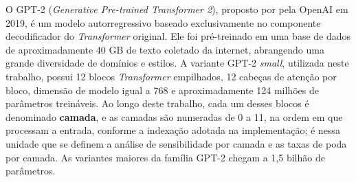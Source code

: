 O GPT-2 (\textit{Generative Pre-trained Transformer 2}), proposto por
 pela OpenAI em 2019, é um modelo autorregressivo baseado
exclusivamente no componente decodificador do \textit{Transformer} original. Ele foi
pré-treinado em uma base de dados de aproximadamente 40 GB de texto coletado da internet,
abrangendo uma grande diversidade de domínios e estilos. A variante GPT-2 \textit{small},
utilizada neste trabalho, possui 12 blocos \textit{Transformer} empilhados, 12 cabeças de
atenção por bloco, dimensão de modelo igual a 768 e aproximadamente 124 milhões de
parâmetros treináveis. Ao longo deste trabalho, cada um desses blocos é denominado
\textbf{camada}, e as camadas são numeradas de 0 a 11, na ordem em que processam a entrada,
conforme a indexação adotada na implementação; é nessa unidade que se definem a análise de
sensibilidade por camada e as taxas de poda por camada. As variantes maiores da família GPT-2
chegam a 1,5 bilhão de parâmetros.
